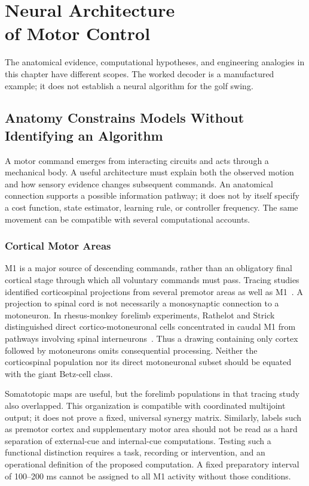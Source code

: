 \chapter[Neural Architecture]{Neural Architecture\\of Motor Control}
\label{ch:neural-arch}

\begin{gomdraftnotice}
The anatomical evidence, computational hypotheses, and engineering analogies in
this chapter have different scopes. The worked decoder is a manufactured
example; it does not establish a neural algorithm for the golf swing.
\end{gomdraftnotice}

\section{Anatomy Constrains Models Without Identifying an Algorithm}

A motor command emerges from interacting circuits and acts through a mechanical
body. A useful architecture must explain both the observed motion and how
sensory evidence changes subsequent commands. An anatomical connection supports
a possible information pathway; it does not by itself specify a cost function,
state estimator, learning rule, or controller frequency. The same movement can
be compatible with several computational accounts.

\subsection{Cortical Motor Areas}

M1 is a major source of descending commands, rather than an obligatory final
cortical stage through which all voluntary commands must pass. Tracing studies
identified corticospinal projections from several premotor areas as well as
M1~\cite{DumStrick1991Review}. A projection to spinal cord is not necessarily a
monosynaptic connection to a motoneuron. In rhesus-monkey forelimb experiments,
Rathelot and Strick distinguished direct cortico-motoneuronal cells concentrated
in caudal M1 from pathways involving spinal interneurons~\cite{RathelotStrick2009Review}.
Thus a drawing containing only cortex followed by motoneurons omits consequential
processing. Neither the corticospinal population nor its direct motoneuronal
subset should be equated with the giant Betz-cell class.

Somatotopic maps are useful, but the forelimb populations in that tracing study
also overlapped. This organization is compatible with coordinated multijoint
output; it does not prove a fixed, universal synergy matrix. Similarly, labels
such as premotor cortex and supplementary motor area should not be read as a
hard separation of external-cue and internal-cue computations. Testing such a
functional distinction requires a task, recording or intervention, and an
operational definition of the proposed computation. A fixed preparatory interval
of 100--200 ms cannot be assigned to all M1 activity without those conditions.

